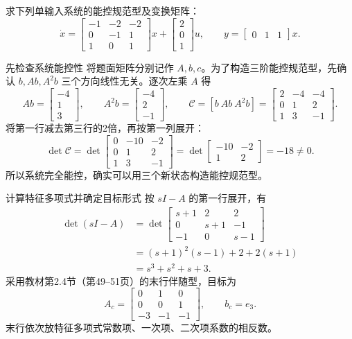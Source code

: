 \documentclass[11pt]{article}
\begin{document}
\begin{problem}[原题 22]
求下列单输入系统的能控规范型及变换矩阵：
\[
\dot x=\begin{bmatrix}-1&-2&-2\\0&-1&1\\1&0&1\end{bmatrix}x
+\begin{bmatrix}2\\0\\1\end{bmatrix}u,
\qquad y=\begin{bmatrix}0&1&1\end{bmatrix}x.
\]
\end{problem}
\begin{solution}
\begin{proofstep}{先检查系统能控性}
将题面矩阵分别记作 $A,b,c$。为了构造三阶能控规范型，先确认
$b,Ab,A^2b$ 三个方向线性无关。逐次左乘 $A$ 得
\[
Ab=\begin{bmatrix}-4\\1\\3\end{bmatrix},\qquad
A^2b=\begin{bmatrix}-4\\2\\-1\end{bmatrix},\qquad
\mathcal C=[b\ Ab\ A^2b]=\begin{bmatrix}2&-4&-4\\0&1&2\\1&3&-1\end{bmatrix}.
\]
将第一行减去第三行的2倍，再按第一列展开：
\[
\det\mathcal C=
\det\begin{bmatrix}0&-10&-2\\0&1&2\\1&3&-1\end{bmatrix}
=\det\begin{bmatrix}-10&-2\\1&2\end{bmatrix}=-18\ne0.
\]
所以系统完全能控，确实可以用三个新状态构造能控规范型。
\end{proofstep}

\pagebreak
\begin{proofstep}{计算特征多项式并确定目标形式}
按 $sI-A$ 的第一行展开，有
\begin{align*}
\det(sI-A)
&=\det\begin{bmatrix}s+1&2&2\\0&s+1&-1\\-1&0&s-1\end{bmatrix}\\
&=(s+1)^2(s-1)+2+2(s+1)\\
&=s^3+s^2+s+3.
\end{align*}
采用教材第2.4节（第49--51页）的末行伴随型，目标为
\[
A_c=\begin{bmatrix}0&1&0\\0&0&1\\-3&-1&-1\end{bmatrix},\qquad b_c=e_3.
\]
末行依次放特征多项式常数项、一次项、二次项系数的相反数。
\end{proofstep}


\end{solution}
\end{document}
